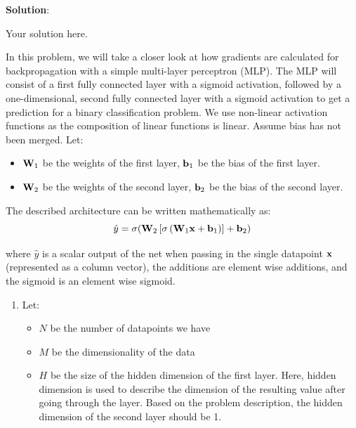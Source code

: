 \documentclass[submit]{../harvardml}
\newenvironment{solution}{
    \vspace{2mm}
    \color{blue}\noindent\textbf{Solution}:
}{}
\begin{document}
\begin{solution}
	Your solution here.
\end{solution}

\newpage


\begin{problem}

In this problem, we will take a closer look at how gradients are calculated for backpropagation with a simple multi-layer perceptron (MLP). The MLP will consist of a first fully connected layer with a sigmoid activation, followed by a one-dimensional, second fully connected layer with a sigmoid activation to get a prediction for a binary classification problem. We use non-linear activation functions as the composition of linear functions is linear. Assume bias has not been merged. Let:
\begin{itemize}
  \item $\bold{W}_1$ be the weights of the first layer, $\bold{b}_1$ be the bias of the first layer.
  \item $\bold{W}_2$ be the weights of the second layer, $\bold{b}_2$ be the bias of the second layer.
\end{itemize}

The described architecture can be written mathematically as: $$\hat{y} = \sigma(\bold{W}_2 \left[\sigma \left(\bold{W}_1 \bold{x} + \bold{b}_1\right)\right] + \bold{b}_2)$$

where $\hat{y}$ is a scalar output of the net when passing in the single datapoint $\bold{x}$ (represented as a column vector), the additions are element wise additions, and the sigmoid is an element wise sigmoid.

\begin{enumerate}
  \item Let:
        \begin{itemize}
          \item $N$ be the number of datapoints we have
          \item $M$ be the dimensionality of the data
          \item $H$ be the size of the hidden dimension of the first layer. Here, hidden dimension is used to describe the dimension of the resulting value after going through the layer. Based on the problem description, the hidden dimension of the second layer should be 1.
        \end{itemize}


\end{enumerate}
\end{problem}
\end{document}
